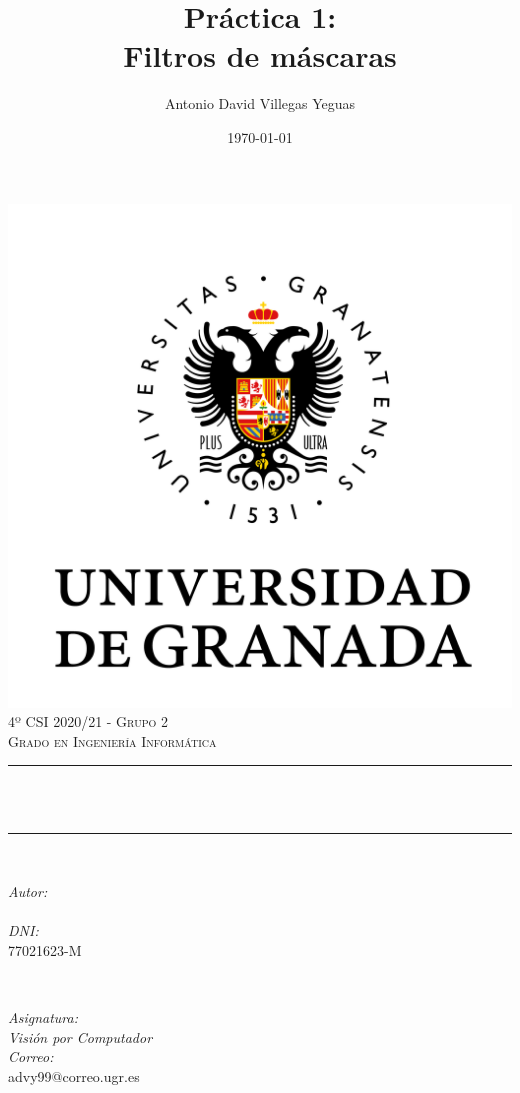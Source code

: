 \documentclass[12pt, spanish]{article}
\title{Práctica 1:\\
Filtros de máscaras  \hspace{0.05cm} }
\author{Antonio David Villegas Yeguas}
\date{\today}
\makeatletter
\let\thetitle\@title
\let\theauthor\@author
\makeatother
\begin{document}

\begin{titlepage}
    \centering
    \vspace*{0.3 cm}
    \includegraphics[scale = 0.50]{ugr.png}\\[0.7 cm]
    \textsc{\large 4º CSI 2020/21 - Grupo 2}\\[0.5 cm]
    \textsc{\large Grado en Ingeniería Informática}\\[0.5 cm]
    \rule{\linewidth}{0.2 mm} \\[0.2 cm]
    { \huge \bfseries \thetitle}\\
    \rule{\linewidth}{0.2 mm} \\[1 cm]

    \begin{minipage}{0.4\textwidth}
        \begin{flushleft} \large
            \emph{Autor:}\\
            \theauthor\\
			 \emph{DNI:}\\
            77021623-M
            \end{flushleft}
            \end{minipage}~
            \begin{minipage}{0.4\textwidth}
            \begin{flushright} \large
            \emph{Asignatura: \\
            Visión por Computador}   \\
            \emph{Correo:}\\
            advy99@correo.ugr.es
        \end{flushright}
    \end{minipage}\\[0.5cm]


\end{titlepage}
\end{document}
